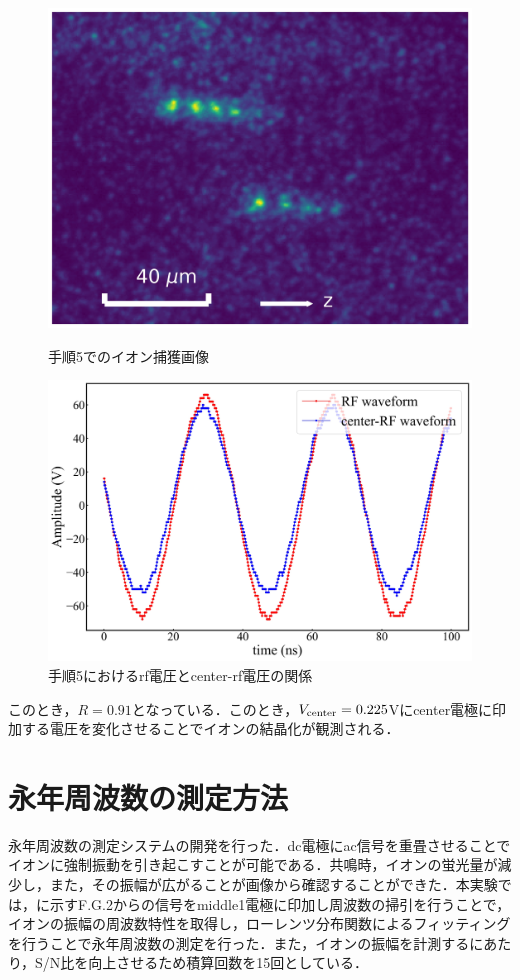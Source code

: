 \begin{enumerate}
\begin{figure}[h]
	\begin{minipage}{0.48\linewidth}
	\begin{center}
		\includegraphics[width = 0.6\columnwidth]{./methods/figure/5_2D.jpg}
		\caption{手順5でのイオン捕獲画像}
		\label{fig:5_2D}
	\end{center}
	\end{minipage}
	\begin{minipage}{0.48\linewidth}
		\begin{center}
			\includegraphics[width = 0.9\columnwidth]{./methods/figure/5_2D_wave.jpg}
			\caption{手順5におけるrf電圧とcenter-rf電圧の関係}
			\label{fig:5_2D_wave}
		\end{center}
	\end{minipage}
\end{figure}

このとき，$R=0.91$となっている．このとき，$V_{\rm center} = 0.225$Vにcenter電極に印加する電圧を変化させることでイオンの結晶化が観測される．

\end{enumerate}

\clearpage

\section{永年周波数の測定方法}
永年周波数の測定システムの開発を行った．dc電極にac信号を重畳させることでイオンに強制振動を引き起こすことが可能である．共鳴時，イオンの蛍光量が減少し，また，その振幅が広がることが画像から確認することができた．本実験では，に示すF.G.2からの信号をmiddle1電極に印加し周波数の掃引を行うことで，イオンの振幅の周波数特性を取得し，ローレンツ分布関数によるフィッティングを行うことで永年周波数の測定を行った．また，イオンの振幅を計測するにあたり，S/N比を向上させるため積算回数を15回としている．

